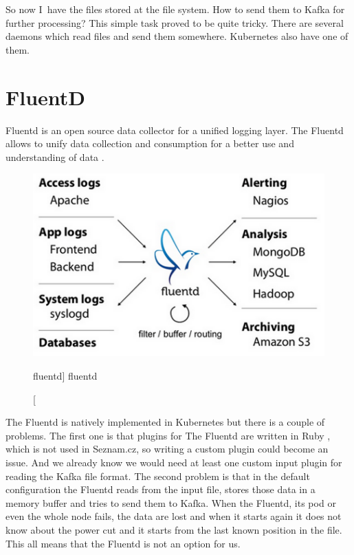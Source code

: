 So now I~have the files stored at the file system. How to send them to Kafka for further processing? This simple task proved to be quite tricky. There are several daemons which read files and send them somewhere. Kubernetes also have one of them.

\section{FluentD}

Fluentd is an open source data collector for a unified logging layer. The Fluentd allows to unify data collection and consumption for a better use and understanding of data \cite{fluentd}.

\begin{figure}[htb]\centering
  \includegraphics[width=1\textwidth]{images/fluentd-architecture.png}
  \caption
    [fluentd]
    {fluentd \cite{fluentd}}
  \label{fig:fluentd}
\end{figure}
 
The Fluentd is natively implemented in Kubernetes but there is a couple of problems. The first one is that plugins for The Fluentd are written in Ruby \cite{ruby}, which is not used in Seznam.cz, so writing a custom plugin could become an issue. And we already know we would need at least one custom input plugin for reading the Kafka file format. The second problem is that in the default configuration the Fluentd reads from the input file, stores those data in a memory buffer and tries to send them to Kafka. When the Fluentd, its pod or even the whole node fails, the data are lost and when it starts again it does not know about the power cut and it starts from the last known position in the file. This all means that the Fluentd is not an option for us.

